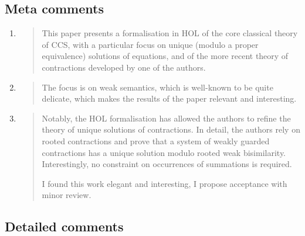 \subsection*{Meta comments}

\begin{enumerate}
\item \begin{quote}
    This paper presents a formalisation in HOL of the core classical
    theory of CCS, with a particular focus on unique (modulo a proper
    equivalence) solutions of equations, and of the more recent theory
    of contractions developed by one of the authors.
  \end{quote}

\item \begin{quote}
    The focus is on weak semantics, which is well-known to be quite
    delicate, which makes the results of the paper relevant and
    interesting.
  \end{quote}

\item \begin{quote}
    Notably, the HOL formalisation has allowed the authors to refine
    the theory of unique solutions of contractions. In detail, the
    authors rely on rooted contractions and prove that a system of
    weakly guarded contractions has a unique solution modulo rooted
    weak bisimilarity. Interestingly, no constraint on occurrences of
    summations is required.

    I found this work elegant and interesting, I propose acceptance with minor review.
  \end{quote}

\end{enumerate}

\subsection*{Detailed comments}

